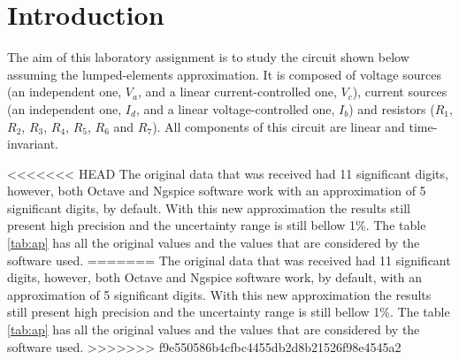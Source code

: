 \section{Introduction}
\label{sec:introduction}

\par
The aim of this laboratory assignment is to study the circuit shown below assuming the lumped-elements approximation. It is composed of voltage sources (an independent one, $V_a$, and a linear current-controlled one, $V_c$), current sources (an independent one, $I_d$, and a linear voltage-controlled one, $I_b$) and resistors ($R_1$, $R_2$, $R_3$, $R_4$, $R_5$, $R_6$ and $R_7$). All components of this circuit are linear and time-invariant.

<<<<<<< HEAD
The original data that was received had 11 significant digits, however, both Octave and Ngspice software work with an approximation of 5 significant digits, by default. With this new approximation the results still present high precision and the uncertainty range is still bellow 1\%. The table \ref{tab:ap} has all the original values and the values that are considered by the software used. 
=======
The original data that was received had 11 significant digits, however, both Octave and Ngspice software work, by default, with an approximation of 5 significant digits. With this new approximation the results still present high precision and the uncertainty range is still bellow 1\%. The table \ref{tab:ap} has all the original values and the values that are considered by the software used. 
>>>>>>> f9e550586b4cfbc4455db2d8b21526f98e4545a2


